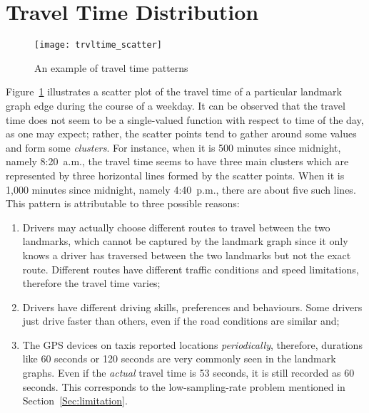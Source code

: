 \begin{table}[h!]
\centering
{}
\caption{An summary of landmark graphs}\label{Ta:ldmkgraphs}
\end{table}

\section{Travel Time Distribution}
\begin{figure}[h!]
\texttt{[image: trvltime\_scatter]}
\centering
\caption{An example of travel time patterns}\label{Fig:wrkd_50m_trvltime}
\end{figure}

Figure~\ref{Fig:wrkd_50m_trvltime} illustrates a scatter plot of the travel time of a particular landmark graph edge during the course of a weekday. It can be observed that the travel time does not seem to be a single-valued function with respect to time of the day, as one may expect; rather, the scatter points tend to gather around some values and form some \emph{clusters}. For instance, when it is 500 minutes since midnight, namely 8:20~a.m., the travel time seems to have three main clusters which are represented by three horizontal lines formed by the scatter points. When it is 1,000 minutes since midnight, namely 4:40~p.m., there are about five such lines. This pattern is attributable to three possible reasons:
\begin{enumerate}
\item Drivers may actually choose different routes to travel between the two landmarks, which cannot be captured by the landmark graph since it only knows a driver has traversed between the two landmarks but not the exact route. Different routes have different traffic conditions and speed limitations, therefore the travel time varies;
\item Drivers have different driving skills, preferences and behaviours. Some drivers just drive faster than others, even if the road conditions are similar and;
\item The GPS devices on taxis reported locations \emph{periodically}, therefore, durations like 60 seconds or 120 seconds are very commonly seen in the landmark graphs. Even if the \emph{actual} travel time is 53 seconds, it is still recorded as 60 seconds. This corresponds to the low-sampling-rate problem mentioned in Section~\ref{Sec:limitation}. 
\end{enumerate}

